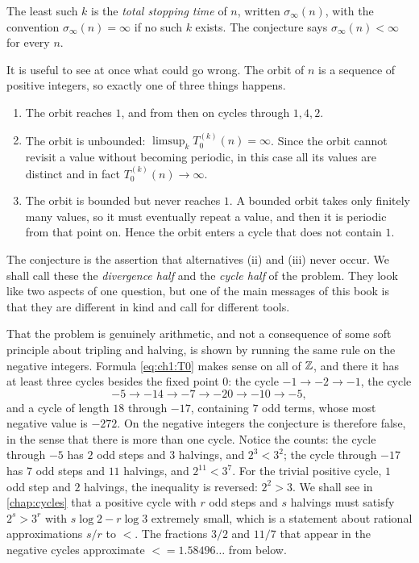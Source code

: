 The least such $k$ is the \emph{total stopping time} of $n$, written
$\sigma_\infty(n)$, with the convention $\sigma_\infty(n)=\infty$ if no such
$k$ exists. The conjecture says $\sigma_\infty(n)<\infty$ for every $n$.

It is useful to see at once what could go wrong. The orbit of $n$ is a sequence
of positive integers, so exactly one of three things happens.
\begin{enumerate}[label=(\roman*),leftmargin=2em]
\item The orbit reaches $1$, and from then on cycles through $1,4,2$.
\item The orbit is unbounded: $\limsup_k T_0^{(k)}(n)=\infty$. Since the orbit
  cannot revisit a value without becoming periodic, in this case all its
  values are distinct and in fact $T_0^{(k)}(n)\to\infty$.
\item The orbit is bounded but never reaches $1$. A bounded orbit takes only
  finitely many values, so it must eventually repeat a value, and then it is
  periodic from that point on. Hence the orbit enters a cycle that does not
  contain $1$.
\end{enumerate}
The conjecture is the assertion that alternatives (ii) and (iii) never occur.
We shall call these the \emph{divergence half} and the \emph{cycle half} of
the problem. They look like two aspects of one question, but one of the main
messages of this book is that they are different in kind and call for
different tools.

That the problem is genuinely arithmetic, and not a consequence of some soft
principle about tripling and halving, is shown by running the same rule on the
negative integers. Formula \eqref{eq:ch1:T0} makes sense on all of $\mathbb{Z}$, and
there it has at least three cycles besides the fixed point $0$: the cycle
$-1\to-2\to-1$, the cycle
\[
  -5\to-14\to-7\to-20\to-10\to-5,
\]
and a cycle of length $18$ through $-17$, containing $7$ odd terms, whose most
negative value is $-272$. On the negative integers the conjecture is therefore
false, in the sense that there is more than one cycle. Notice the counts: the
cycle through $-5$ has $2$ odd steps and $3$ halvings, and $2^3<3^2$; the
cycle through $-17$ has $7$ odd steps and $11$ halvings, and $2^{11}<3^{7}$.
For the trivial positive cycle, $1$ odd step and $2$ halvings, the inequality
is reversed: $2^2>3$. We shall see in \cref{chap:cycles} that a positive cycle
with $r$ odd steps and $s$ halvings must satisfy $2^s>3^r$ with
$s\log2-r\log3$ extremely small, which is a statement about rational
approximations $s/r$ to $\lt$. The fractions $3/2$ and $11/7$ that appear in
the negative cycles approximate $\lt=1.58496\ldots$ from below.

